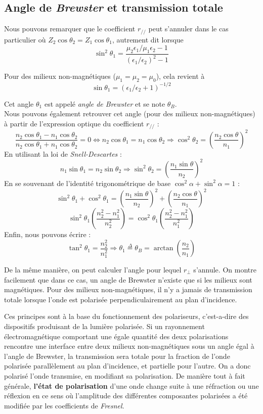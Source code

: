 \subsection{Angle de \textit{Brewster} et transmission totale}

Nous pouvons remarquer que le coefficient $r_{//}$ peut s'annuler dans le cas particulier où $Z_2\cos\theta_{2} = Z_1\cos\theta_{1}$, autrement dit lorsque 
\[\sin^2\theta_1 = \frac{\mu_2\epsilon_1/\mu_1\epsilon_2 - 1}{(\epsilon_1/\epsilon_2)^2-1}\]

Pour des milieux non-magnétiques ($\mu_1 = \mu_2 = \mu_0$), cela revient à 
\[\sin\theta_1 = (\epsilon_1/\epsilon_2+1)^{-1/2}\]

Cet angle $\theta_1$ est appelé \textit{angle de Brewster} et se note $\theta_{B}$. \\

Nous pouvons également retrouver cet angle (pour des milieux non-magnétiques) à partir de l'expression optique du coefficient $r_{//}$ : 
\[\frac{n_{2}\cos \theta_{1} - n_{1} \cos \theta_{2} }{n_{2} \cos \theta_{1} + n_{1} \cos \theta_{2} } = 0 \Leftrightarrow n_{2} \cos \theta_{1} = n_{1} \cos \theta_{2} \Rightarrow \cos^{2} \theta_{2} = \left(\frac{n_{2} \cos \theta}{n_{1}}\right)^{2}\]
En utilisant la loi de \textit{Snell-Descartes} : 
\[n_{1} \sin \theta_{1} = n_{2} \sin \theta_{2} \Rightarrow \sin^{2} \theta_{2} = \left(\frac{n_{1} \sin \theta}{n_{2}}\right)^{2} \] 
En se souvenant de l'identité trigonométrique de base $ \cos^{2} \alpha + \sin^{2} \alpha = 1$ : 
\[\sin^{2} \theta_{1} + \cos^{2} \theta_{1} = \left(\frac{n_{1} \sin \theta}{n_{2}}\right)^{2} +  \left(\frac{n_{2} \cos \theta}{n_{1}}\right)^{2}\]
\[\sin^{2} \theta_{1} \left(\frac{n_{2}^{2} - n_{1}^{2}}{n_{2}^{2}}\right) = \cos^{2} \theta_{1} \left(\frac{n_{2}^{2} - n_{1}^{2}}{n_{1}^{2}}\right)\]
Enfin, nous pouvons écrire : 
\[\tan^{2} \theta_{1} = \frac{n_{2}^{2}}{n_{1}^{2}} \Rightarrow \theta_{1} \overset{\Delta}= \theta_{B} = \arctan\left(\frac{n_{2}}{n_{1}}\right)\]

De la même manière, on peut calculer l'angle pour lequel $r_{\perp}$ s'annule. On montre facilement que dans ce cas, un angle de Brewster n'existe que si les milieux sont magnétiques. Pour des milieux non-magnétiques, il n'y a jamais de transmission totale lorsque l'onde est polarisée perpendiculairement au plan d'incidence. 

Ces principes sont à la base du fonctionnement des polariseurs, c'est-a-dire des dispositifs produisant de la lumière polarisée. Si un rayonnement électromagnétique comportant une égale quantité des deux polarisations rencontre une interface entre deux milieux non-magnétiques sous un angle égal à l'angle de Brewster, la transmission sera totale pour la fraction de l'onde polarisée parallèlement au plan d'incidence, et partielle pour l'autre. On a donc polarisé l'onde transmise, en modifiant sa polarisation. De manière tout à fait générale, \textbf{l'état de polarisation} d'une onde change suite à une réfraction ou une réflexion en ce sens où l'amplitude des différentes composantes polarisées a été modifiée par les coefficients de \textit{Fresnel}. 

